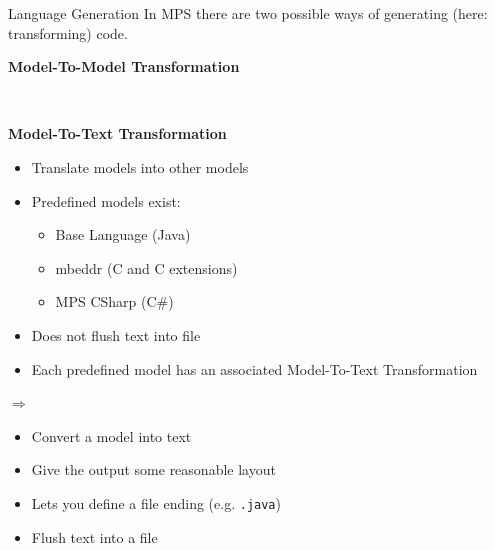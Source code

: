 	\begin{frame}{Language Generation}
		In MPS there are two possible ways of generating (here: transforming) code.\\
		
		\begin{minipage}{0.4\textwidth}
			\textbf{Model-To-Model Transformation}
		\end{minipage} 
		\begin{minipage}{0.09\textwidth}
			\Large
			\textcolor{white}{$\Rightarrow$}
		\end{minipage}
		\begin{minipage}{0.4\textwidth}
			\textbf{Model-To-Text Transformation}
		\end{minipage}
	
		\vspace*{0.5cm}
		
		\begin{minipage}{0.4\textwidth}
			\begin{itemize}
				\item Translate models into other models
				\item Predefined models exist:
				\begin{itemize}
					\item Base Language (Java)
					\item mbeddr (C and C extensions) \footnotemark[8]
					\item MPS CSharp (C\#) \footnotemark[9]
				\end{itemize}
				\item Does not flush text into file
				\item Each predefined model has an associated Model-To-Text Transformation
			\end{itemize}
		\end{minipage} 
		\begin{minipage}{0.09\textwidth}
			\Large
			$\Rightarrow$
		\end{minipage}
		\begin{minipage}{0.4\textwidth}
			\begin{itemize}
				\item Convert a model into text
				\item Give the output some reasonable layout
				\item Lets you define a file ending (e.g. \texttt{.java})
				\item Flush text into a file
			\end{itemize}
		\end{minipage}
	\end{frame}
	


